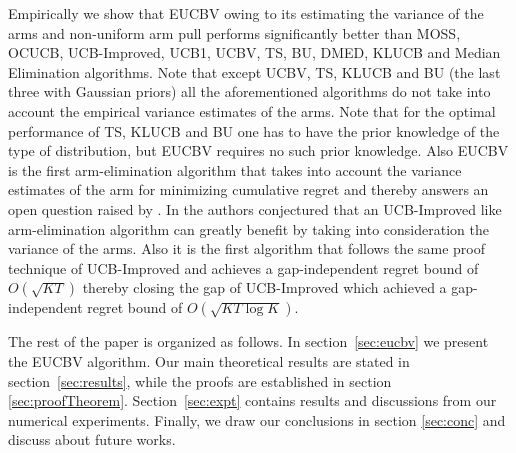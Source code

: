 Empirically we show that EUCBV owing to its estimating the variance of the arms and non-uniform arm pull  performs significantly better than MOSS, OCUCB, UCB-Improved, UCB1, UCBV, TS, BU, DMED, KLUCB and Median Elimination algorithms. Note that except UCBV, TS, KLUCB and BU (the last three with Gaussian priors) all the aforementioned algorithms do not take into account the empirical variance estimates of the arms. Note that for the optimal performance of TS, KLUCB and BU one has to have the prior knowledge of the type of distribution,  but EUCBV requires no such prior knowledge. Also EUCBV is the first arm-elimination algorithm that takes into account the variance estimates of the arm for minimizing cumulative regret and thereby answers an open question raised by \citet{auer2010ucb}. In \citet{auer2010ucb} the authors conjectured that an UCB-Improved like arm-elimination algorithm can greatly benefit by taking into consideration the variance of the arms. Also it is the first algorithm that follows the same proof technique of UCB-Improved and achieves a gap-independent regret bound of $O\left( \sqrt{KT} \right)$ thereby closing the gap of UCB-Improved which achieved a gap-independent regret bound of $O\left( \sqrt{KT\log K} \right)$. 
	
	The rest of the paper is organized as follows. In section~\ref{sec:eucbv} we present the  EUCBV algorithm. Our main theoretical results are stated in section~\ref{sec:results}, while the proofs are established in   section \ref{sec:proofTheorem}. Section~\ref{sec:expt} contains results and discussions from our numerical experiments. Finally, we draw our conclusions in section \ref{sec:conc} and discuss about future works.
	
	
	